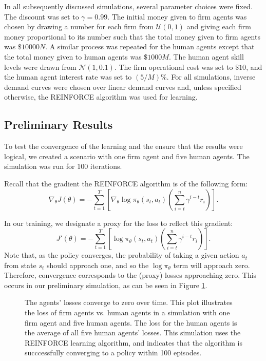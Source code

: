 \documentclass[twoside,twocolumn]{article}
\begin{document}
\medskip
In all subsequently discussed simulations, several parameter choices were fixed. The discount was set to $\gamma = 0.99$. The initial money given to firm agents was chosen by drawing a number for each firm from $\mathcal{U}(0, 1)$ and giving each firm money proportional to its number such that the total money given to firm agents was $\$10000N$. A similar process was repeated for the human agents except that the total money given to human agents was $\$1000M$. The human agent skill levels were drawn from $\mathcal{N}(1, 0.1)$. The firm operational cost was set to $\$10$, and the human agent interest rate was set to $(5/M)\%$. For all simulations, inverse demand curves were chosen over linear demand curves and, unless specified otherwise, the REINFORCE algorithm was used for learning.

\subsection{Preliminary Results}

To test the convergence of the learning and the ensure that the results were logical, we created a scenario with one firm agent and five human agents. The simulation was run for 100 iterations. 

\medskip 

Recall that the gradient the REINFORCE algorithm is of the following form:
\[
  \nabla_{\theta} J(\theta) = -\sum_{t = 1}^T \left[\nabla_{\theta} \log \pi_\theta(s_t, a_t) \left( \sum_{i = t}^n \gamma^{i - t}r_i \right) \right].  
\]

In our training, we designate a proxy for the loss to reflect this gradient:
\[
  J'(\theta) = -\sum_{t = 1}^T \left[\log \pi_\theta(s_t, a_t) \left( \sum_{i = t}^n \gamma^{i - t}r_i \right) \right].  
\]
Note that, as the policy converges, the probability of taking a given action $a_t$ from state $s_t$ should approach one, and so the $\log \pi_\theta$ term will approach zero. Therefore, convergence corresponds to the (proxy) losses approaching zero. This occurs in our preliminary simulation, as can be seen in Figure \ref{plt:losstozero}.

\begin{figure}[h]
\caption{The agents' losses converge to zero over time. This plot illustrates the loss of firm agents vs. human agents in a simulation with one firm agent and five human agents. The loss for the human agents is the average of all five human agents' losses. This simulation uses the REINFORCE learning algorithm, and indicates that the algorithm is succcessfully converging to a policy within 100 episodes.}
\label{plt:losstozero}
\end{figure}
\end{document}
